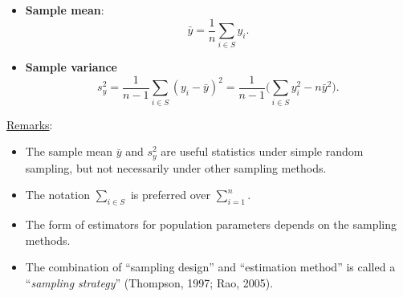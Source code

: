 \begin{Regular}{}
      \begin{itemize}
            \item \textbf{Sample mean}:
                  \[ \bar{y}=\frac{1}{n}\sum_{i\in S}y_i. \]
            \item \textbf{Sample variance}
                  \[ s_y^2=\frac{1}{n-1}\sum_{i\in S}(y_i-\bar{y})^2=\frac{1}{n-1}\biggl(\sum_{i\in S}y_i^2-n\bar{y}^2\biggr). \]
      \end{itemize}
      \tcblower{}
      \underline{Remarks}:
      \begin{itemize}
            \item The sample mean $ \bar{y} $ and $ s_y^2 $ are useful
                  statistics under simple random sampling, but not necessarily under
                  other sampling methods.
            \item The notation $ \sum_{i\in S} $ is preferred over
                  $ \sum_{i=1}^{n} $.
            \item The form of estimators for population parameters depends on the
                  sampling methods.
            \item The combination of ``sampling design'' and ``estimation method''
                  is called a ``\emph{sampling strategy}'' (Thompson, 1997; Rao, 2005).
      \end{itemize}
\end{Regular}
